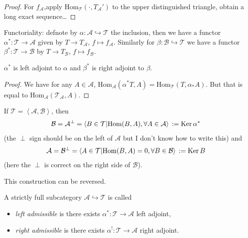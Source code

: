 \begin{proof}
For $f_{\mathcal{A}}$,apply
$\text{Hom}_{\mathcal{T}}(\cdot,
T_{\mathcal{A}
}')$
to the upper distinguished triangle, obtain a
long exact sequence\ldots{}
\end{proof}

Functoriality: defnote by $\alpha:\mathcal{A}
\hookrightarrow  \mathcal{T}$ the inclusion,
then we have a functor $\alpha^*:\mathcal{T}
\to \mathcal{A}$ given by $T \to
T_{\mathcal{A}}$, $f \mapsto
f_{\mathcal{A}}$. Similarly for
$\beta:\mathcal{B} \hookrightarrow
\mathcal{T}$ we have a functor $\beta
^*:\mathcal{T} \to \mathcal{B}$ by $T \to
T_{\mathcal{B}}$, $f \mapsto
f_{\mathcal{B}}$.

\begin{lemma}
\label{lemma-alpha-and-beta-adjoint}
$\alpha^*$ is left adjoint to $\alpha$ and
$\beta^*$ is right adjoint to $\beta.$
\end{lemma}

\begin{proof}
We have for any $A \in \mathcal{A}$,
$\text{Hom}_{\mathcal{A}}(\alpha^*T,A)=
\text{Hom}_{\mathcal{T}}(T,\alpha_*A)$.
But that is equal to
$\text{Hom}_{\mathcal{A}}(\mathcal{T}
_{\mathcal{A}},A)$.
\end{proof}

\begin{exercise}
\label{exercise-orthogonal}
If
$\mathcal{T}=\left\langle{}\mathcal{A},\mathcal{B}
\right\rangle{}$,
then
$$
\mathcal{B}=\mathcal{A}^\perp=\left\langle{}B \in
\mathcal{T} |
\text{Hom}(B,A), \forall A \in
\mathcal{A}\right\rangle{}:=\mathop{\mathrm{Ker}} \alpha^*
$$
(the $\perp$ sign should be on the left of
$\mathcal{A}$ but I don't know how to write
this) and
$$
\mathcal{A}=\mathcal{B}^\perp=\left\langle{}A \in
\mathcal{T} |
\text{Hom}(B,A)=0,\forall B \in
\mathcal{B}\right\rangle{}:=\mathop{\mathrm{Ker}} B
$$
(here the $\perp$ is correct on the right
side of $\mathcal{B}$).
\end{exercise}

This construction can be reversed.

\begin{definition}
\label{dcos-label-022}
A strictly full subcategory $\mathcal{A}
\hookrightarrow  \mathcal{T}$ is called
\begin{itemize}
\item {\it left admissible} is there exists
$\alpha^*:\mathcal{T} \to
\mathcal{A}$ left adjoint,
\item {\it right admissible} is there exists
$\alpha^!:\mathcal{T} \to
\mathcal{A}$ right adjoint.
\end{itemize}
\end{definition}

